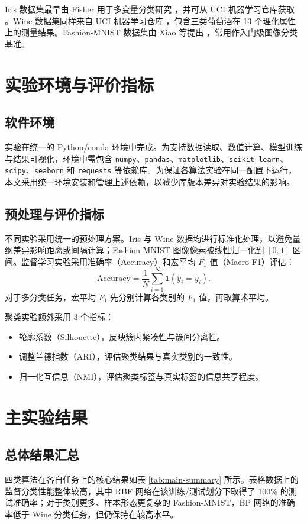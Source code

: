 \documentclass[UTF8]{ctexart}
\begin{document}
Iris 数据集最早由 Fisher 用于多变量分类研究 \cite{fisher1936iris}，并可从 UCI 机器学习仓库获取 \cite{uciiris}。Wine 数据集同样来自 UCI 机器学习仓库 \cite{uciwine}，包含三类葡萄酒在 13 个理化属性上的测量结果。Fashion-MNIST 数据集由 Xiao 等提出 \cite{xiao2017fashion}，常用作入门级图像分类基准。

\section{实验环境与评价指标}

\subsection{软件环境}
实验在统一的 Python/conda 环境中完成。为支持数据读取、数值计算、模型训练与结果可视化，环境中需包含 \texttt{numpy}、\texttt{pandas}、\texttt{matplotlib}、\texttt{scikit-learn}、\texttt{scipy}、\texttt{seaborn} 和 \texttt{requests} 等依赖库。为保证各算法实验在同一配置下运行，本文采用统一环境安装和管理上述依赖，以减少库版本差异对实验结果的影响。

\subsection{预处理与评价指标}
不同实验采用统一的预处理方案。Iris 与 Wine 数据均进行标准化处理，以避免量纲差异影响距离或间隔计算；Fashion-MNIST 图像像素被线性归一化到 $[0,1]$ 区间。监督学习实验采用准确率（Accuracy）和宏平均 $F_1$ 值（Macro-F1）评估：
\begin{equation}
\text{Accuracy}=\frac{1}{N}\sum_{i=1}^{N}\mathbf{1}(\hat{y}_i=y_i).
\end{equation}
对于多分类任务，宏平均 $F_1$ 先分别计算各类别的 $F_1$ 值，再取算术平均。

聚类实验额外采用 3 个指标：
\begin{itemize}
\item 轮廓系数（Silhouette），反映簇内紧凑性与簇间分离性。
\item 调整兰德指数（ARI），评估聚类结果与真实类别的一致性。
\item 归一化互信息（NMI），评估聚类标签与真实标签的信息共享程度。
\end{itemize}

\section{主实验结果}

\subsection{总体结果汇总}
四类算法在各自任务上的核心结果如表 \ref{tab:main-summary} 所示。表格数据上的监督分类性能整体较高，其中 RBF 网络在该训练/测试划分下取得了 100\% 的测试准确率；对于类别更多、样本形态更复杂的 Fashion-MNIST，BP 网络的准确率低于 Wine 分类任务，但仍保持在较高水平。
\end{document}
